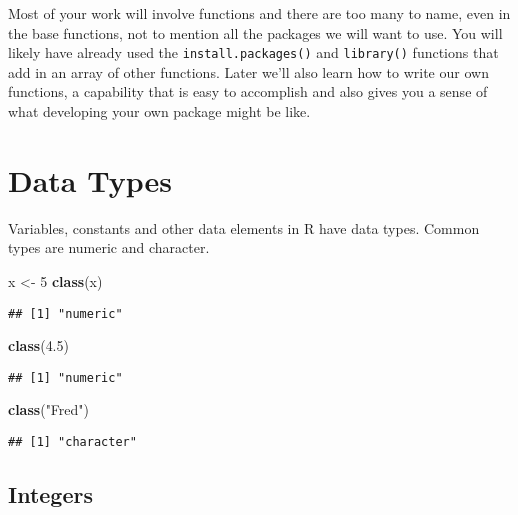 \documentclass[
]{book}
\newenvironment{Shaded}{\begin{snugshade}}{\end{snugshade}}
\newcommand{\DecValTok}[1]{\textcolor[rgb]{0.00,0.00,0.81}{#1}}
\newcommand{\FloatTok}[1]{\textcolor[rgb]{0.00,0.00,0.81}{#1}}
\newcommand{\KeywordTok}[1]{\textcolor[rgb]{0.13,0.29,0.53}{\textbf{#1}}}
\newcommand{\NormalTok}[1]{#1}
\newcommand{\StringTok}[1]{\textcolor[rgb]{0.31,0.60,0.02}{#1}}
\begin{document}
Most of your work will involve functions and there are too many to name,
even in the base functions, not to mention all the packages we will want to use.
You will likely have already used the \texttt{install.packages()} and \texttt{library()} functions
that add in an array of other functions.
Later we'll also learn how to write our own functions, a capability that is easy to
accomplish and also gives you a sense of what developing your own package might be like.

\hypertarget{data-types}{%
\section{Data Types}\label{data-types}}

Variables, constants and other data elements in R have data types.
Common types are numeric and character.

\begin{Shaded}
\begin{Highlighting}[]
\NormalTok{x <-}\StringTok{ }\DecValTok{5}
\KeywordTok{class}\NormalTok{(x)}
\end{Highlighting}
\end{Shaded}

\begin{verbatim}
## [1] "numeric"
\end{verbatim}

\begin{Shaded}
\begin{Highlighting}[]
\KeywordTok{class}\NormalTok{(}\FloatTok{4.5}\NormalTok{)}
\end{Highlighting}
\end{Shaded}

\begin{verbatim}
## [1] "numeric"
\end{verbatim}

\begin{Shaded}
\begin{Highlighting}[]
\KeywordTok{class}\NormalTok{(}\StringTok{"Fred"}\NormalTok{)}
\end{Highlighting}
\end{Shaded}

\begin{verbatim}
## [1] "character"
\end{verbatim}

\hypertarget{integers}{%
\subsection{Integers}\label{integers}}
\end{document}
